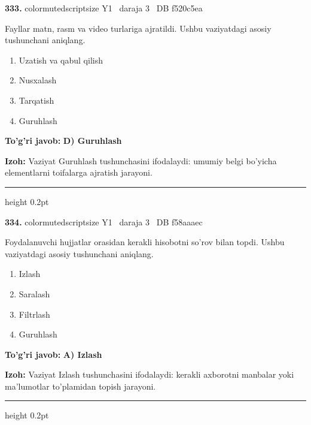 \documentclass[10pt,a4paper,oneside]{article}
\begin{document}
\noindent\textbf{\color{ink}333.}  {color{muted}scriptsize Y1 \textbullet\ daraja 3 \textbullet\ DB f520c5ea}
\par
Fayllar matn, rasm va video turlariga ajratildi. Ushbu vaziyatdagi asosiy tushunchani aniqlang.
\begin{enumerate}[label=\Alph*),leftmargin=9mm]
\item Uzatish va qabul qilish
\item Nusxalash
\item Tarqatish
\item Guruhlash
\end{enumerate}
\begin{tcolorbox}[enhanced,breakable,colback=teal!4,colframe=teal!50!black,boxrule=0.5pt,arc=1.1mm,left=3mm,right=3mm,top=1.7mm,bottom=1.7mm,before skip=2mm,after skip=2mm]
\textbf{\color{teal}To'g'ri javob:} \textbf{D) Guruhlash}
\par\smallskip
\textbf{Izoh:} Vaziyat Guruhlash tushunchasini ifodalaydi: umumiy belgi bo'yicha elementlarni toifalarga ajratish jarayoni.
\end{tcolorbox}
\vspace{2mm}\hrule height 0.2pt \vspace{3mm}

\noindent\textbf{\color{ink}334.}  {color{muted}scriptsize Y1 \textbullet\ daraja 3 \textbullet\ DB f58aaaec}
\par
Foydalanuvchi hujjatlar orasidan kerakli hisobotni so'rov bilan topdi. Ushbu vaziyatdagi asosiy tushunchani aniqlang.
\begin{enumerate}[label=\Alph*),leftmargin=9mm]
\item Izlash
\item Saralash
\item Filtrlash
\item Guruhlash
\end{enumerate}
\begin{tcolorbox}[enhanced,breakable,colback=teal!4,colframe=teal!50!black,boxrule=0.5pt,arc=1.1mm,left=3mm,right=3mm,top=1.7mm,bottom=1.7mm,before skip=2mm,after skip=2mm]
\textbf{\color{teal}To'g'ri javob:} \textbf{A) Izlash}
\par\smallskip
\textbf{Izoh:} Vaziyat Izlash tushunchasini ifodalaydi: kerakli axborotni manbalar yoki ma'lumotlar to'plamidan topish jarayoni.
\end{tcolorbox}
\vspace{2mm}\hrule height 0.2pt \vspace{3mm}
\end{document}
